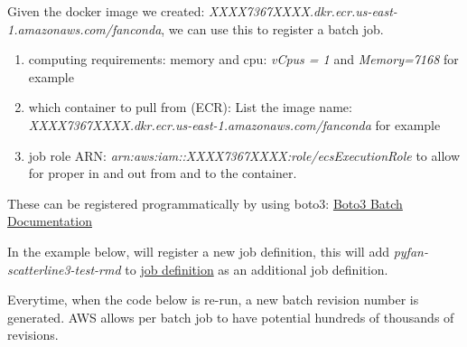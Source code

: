 \documentclass[
]{book}
\providecommand{\tightlist}{%
  \setlength{\itemsep}{0pt}\setlength{\parskip}{0pt}}
\begin{document}
Given the docker image we created: \emph{XXXX7367XXXX.dkr.ecr.us-east-1.amazonaws.com/fanconda}, we can use this to register a batch job.

\begin{enumerate}
\def\labelenumi{\arabic{enumi}.}
\tightlist
\item
  computing requirements: memory and cpu: \emph{vCpus = 1} and \emph{Memory=7168} for example
\item
  which container to pull from (ECR): List the image name: \emph{XXXX7367XXXX.dkr.ecr.us-east-1.amazonaws.com/fanconda} for example
\item
  job role ARN: \emph{arn:aws:iam::XXXX7367XXXX:role/ecsExecutionRole} to allow for proper in and out from and to the container.
\end{enumerate}

These can be registered programmatically by using boto3: \href{https://boto3.amazonaws.com/v1/documentation/api/latest/reference/services/batch.html}{Boto3 Batch Documentation}

In the example below, will register a new job definition, this will add \emph{pyfan-scatterline3-test-rmd} to \href{https://console.aws.amazon.com/batch/v2/home?region=us-east-1\#job-definition}{job definition} as an additional job definition.

Everytime, when the code below is re-run, a new batch revision number is generated. AWS allows per batch job to have potential hundreds of thousands of revisions.
\end{document}
